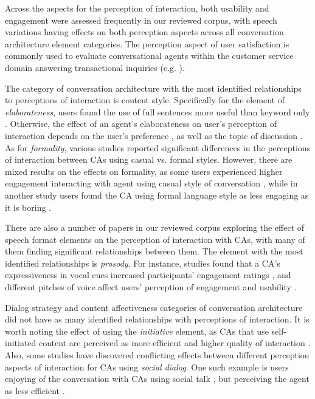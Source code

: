 Across the aspects for the perception of interaction, both usability and engagement were assessed frequently in our reviewed corpus, with speech variations having effects on both perception aspects across all conversation architecture element categories. The perception aspect of user satisfaction is commonly used to evaluate conversational agents within the customer service domain answering transactional inquiries (e.g. \cite{diederich2019emulating, elsholz2019exploring, gnewuch2018faster}\cmt{[25][61][19]}).

The category of conversation architecture with the most identified relationships to perceptions of interaction is content style. Specifically for the element of \textit{elaborateness}, users found the use of full sentences more useful than keyword only \cite{haas2022keep, roy2021users}\cmt{[78][71]}. Otherwise, the effect of an agent's elaborateness on user's perception of interaction depends on the user's preference \cite{miehle2018exploring}\cmt{[51]}, as well as the topic of discussion \cite{haas2022keep}\cmt{[78]}. As for \textit{formality}, various studies reported significant differences in the perceptions of interaction between CAs using casual vs. formal styles. However, there are mixed results on the effects on formality, as some users experienced higher engagement interacting with agent using casual style of conversation \cite{cox2022does}\cmt{[27]}, while in another study users found the CA using formal language style as less engaging as it is boring \cite{kim2019comparing}\cmt{[89]}.

There are also a number of papers in our reviewed corpus exploring the effect of speech format elements on the perception of interaction with CAs, with many of them finding significant relationships between them. The element with the most identified relationships is \textit{prosody}. For instance, studies found that a CA's expressiveness in vocal cues increased participants' engagement ratings \cite{zhu2022effects}\cmt{[26]}, and different pitches of voice affect users' perception of engagement and usability \cite{chan2021kinvoices, habler2019effects}\cmt{[74][63]}.

Dialog strategy and content affectiveness categories of conversation architecture did not have as many identified relationships with perceptions of interaction. It is worth noting the effect of using the \textit{initiative} element, as CAs that use self-initiated content are perceived as more efficient and higher quality of interaction \cite{cuadra2021my}\cmt{[67]}. Also, some studies have discovered conflicting effects between different perception aspects of interaction for CAs using \textit{social dialog}. One such example is users enjoying of the conversation with CAs using social talk \cite{lee2020hear, roy2021users}\cmt{[23][71]}, but perceiving the agent as less efficient \cite{roy2021users}\cmt{[71]}.

